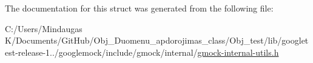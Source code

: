 The documentation for this struct was generated from the following file\+:\begin{DoxyCompactItemize}
\item 
C\+:/\+Users/\+Mindaugas K/\+Documents/\+Git\+Hub/\+Obj\+\_\+\+Duomenu\+\_\+apdorojimas\+\_\+class/\+Obj\+\_\+test/lib/googletest-\/release-\/1../googlemock/include/gmock/internal/\mbox{\hyperlink{_obj__test_2lib_2googletest-release-1_88_81_2googlemock_2include_2gmock_2internal_2gmock-internal-utils_8h}{gmock-\/internal-\/utils.\+h}}\end{DoxyCompactItemize}
